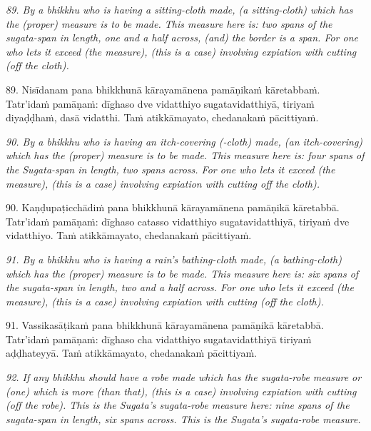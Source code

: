 \documentclass[11pt]{article}
\begin{document}
\begin{paracol}{2}
\begin{column}
{\itshape\footnotesize
89. By a bhikkhu who is having a sitting-cloth made, (a sitting-cloth) which has the (proper) measure is to be made. This measure here is: two spans of the sugata-span in length, one and a half across, (and) the border is a span. For one who lets it exceed (the measure), (this is a case) involving expiation with cutting (off the cloth).
}
\switchcolumn

\begin{flushleft}
89. Nisīdanam pana bhikkhunā kārayamānena pamāṇikaṁ kāretabbaṁ. Tatr’idaṁ pamāṇaṁ: dīghaso dve vidatthiyo sugatavidatthiyā, tiriyaṁ diyaḍḍhaṁ, dasā vidatthi. Taṁ atikkāmayato, chedanakaṁ pācittiyaṁ.
\switchcolumn*
\end{flushleft}

{\itshape\footnotesize
90. By a bhikkhu who is having an itch-covering (-cloth) made, (an itch-covering) which has the (proper) measure is to be made. This measure here is: four spans of the Sugata-span in length, two spans across. For one who lets it exceed (the measure), (this is a case) involving expiation with cutting off the cloth).
}
\switchcolumn

\begin{flushleft}
90. Kaṇḍupaṭicchādiṁ pana bhikkhunā kārayamānena pamāṇikā kāretabbā. Tatr’idaṁ pamāṇaṁ: dīghaso catasso vidatthiyo sugatavidatthiyā, tiriyaṁ dve vidatthiyo. Taṁ atikkāmayato, chedanakaṁ pācittiyaṁ.
\switchcolumn*
\end{flushleft}

{\itshape\footnotesize
91. By a bhikkhu who is having a rain's bathing-cloth made, (a bathing-cloth) which has the (proper) measure is to be made. This measure here is: six spans of the sugata-span in length, two and a half across. For one who lets it exceed (the measure), (this is a case) involving expiation with cutting (off the cloth).
}
\switchcolumn

\begin{flushleft}
91. Vassikasāṭikaṁ pana bhikkhunā kārayamānena pamāṇikā kāretabbā. Tatr’idaṁ pamāṇaṁ: dīghaso cha vidatthiyo sugatavidatthiyā tiriyaṁ aḍḍhateyyā. Taṁ atikkāmayato, chedanakaṁ pācittiyaṁ.
\switchcolumn*
\end{flushleft}

{\itshape\footnotesize
92. If any bhikkhu should have a robe made which has the sugata-robe measure or (one) which is more (than that), (this is a case) involving expiation with cutting (off the robe). This is the Sugata's sugata-robe measure here: nine spans of the sugata-span in length, six spans across. This is the Sugata's sugata-robe measure.
}
\switchcolumn


\end{column}
\end{paracol}
\end{document}
